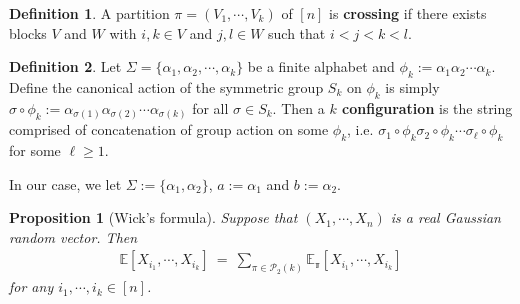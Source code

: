 \documentclass[12pt,reqno]{amsart}
\theoremstyle{plain} %
\newtheorem{prop}[theorem]{Proposition}
\theoremstyle{remark}
\theoremstyle{definition}
\newtheorem*{defn}{Definition}
\renewcommand{\a}{\alpha}
\begin{document}
\begin{defn}
A partition $\pi=(V_1,\cdots, V_k)$ of $[n]$ is \textbf{crossing} if there exists blocks $V$ and $W$ with $i, k\in V$ and $j, l\in W$ such that $i<j<k<l$.
\end{defn}

\begin{defn}
Let $\Sigma=\{\a_1,\a_2,\cdots, \a_k\}$ be a finite alphabet and $\phi_k:=\a_1\a_2\cdots\a_k$. Define the canonical action of the symmetric group $S_k$ on $\phi_k$ is simply $\sigma \circ \phi_k:=\a_{\sigma(1)}\a_{\sigma(2)}\cdots \a_{\sigma(k)}$ for all $\sigma\in S_k$. Then a \textbf{$k$ configuration} is the string comprised of concatenation of group action on some $\phi_k$, i.e. $\sigma_1\circ \phi_k\sigma_2\circ \phi_k\cdots\sigma_\ell \circ \phi_k$ for some $\ell\geq 1$.
\end{defn}
In our case, we let $\Sigma:=\{\a_1, \a_2\}$, $a:=\a_1$ and $b:=\a_2$.
\begin{prop}[Wick's formula]
Suppose that $(X_1, \cdots, X_n)$ is a real Gaussian random vector. Then
\begin{align*}
\mathbb{E}[X_{i_1}, \cdots, X_{i_k}] \ = \ \sum_{\pi\in \mathcal{P}_2(k)}\mathbb{E_\pi}[X_{i_1},\cdots, X_{i_k}]
\end{align*}
for any $i_1,\cdots, i_k\in [n]$.
\end{prop}
\end{document}
